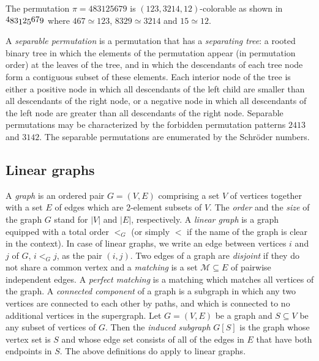 \begin{example}
The permutation $\pi = 483125679$ is $(123, 3214, 12)$-colorable
as shown in
$
\raisebox{1.5pt}{$4$}
\raisebox{0pt}{$8$}
\raisebox{0pt}{$3$}
\raisebox{-1.5pt}{$1$}
\raisebox{0pt}{$2$}
\raisebox{-1.5pt}{$5$}
\raisebox{1.5pt}{$6$}
\raisebox{1.5pt}{$7$}
\raisebox{0pt}{$9$}
$
where
$467 \simeq 123$,
$8329 \simeq 3214$ and
$15 \simeq 12$.
\end{example}

A \emph{separable permutation} is a permutation that has a \emph{separating tree}:
a rooted binary tree in which the elements
of the permutation appear (in permutation order) at the leaves of the tree,
and in which the descendants of each tree node form a contiguous subset of
these elements.
Each interior node of the tree is either a positive node in which all
descendants of the left child are smaller than all descendants of the right node,
or a negative node in which all descendants of the left node are greater than all
descendants of the right node.
Separable permutations may be characterized by the forbidden permutation
patterns $2413$ and $3142$.
The separable permutations are enumerated by the Schröder numbers.

\subsection*{\textbf{Linear graphs}}

A \emph{graph} is an ordered pair $G = (V, E)$ comprising a set $V$ of
vertices together with a set $E$ of edges which are 2-element subsets of $V$.
The \emph{order} and the \emph{size} of the graph $G$ stand for
$|V|$ and $|E|$, respectively.
A \emph{linear graph} is a graph equipped with a total order $<_G$
(or simply $<$ if the name of the graph is clear in the context).
In case of linear graphs, we write an edge between vertices $i$ and $j$ of
$G$, $i <_G j$, as the pair $(i, j)$.
Two edges of a graph are \emph{disjoint} if they do not share a common
vertex and a \emph{matching} is a set $\mathcal{M} \subseteq E$ of
pairwise independent edges.
A \emph{perfect matching} is a matching which matches all vertices of the
graph.
A \emph{connected component} of a graph is a subgraph in which any
two vertices are connected to each other by paths, and which is connected
to no additional vertices in the supergraph.
Let $G = (V, E)$ be a graph and $S \subseteq V$ be any subset of
vertices of $G$. Then the \emph{induced subgraph} $G[S]$ is the graph whose
vertex set is $S$ and whose edge set consists of all of the edges in $E$
that have both endpoints in $S$.
The above definitions do apply to linear graphs.

